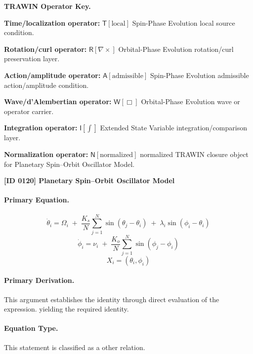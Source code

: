 \par\vspace{0.45\baselineskip}
\noindent\begin{minipage}[t]{\linewidth}
\begingroup
\small
\raggedright
\textbf{TRAWIN Operator Key.}\par
\noindent\textbf{Time/localization operator:} $\mathsf{T}\!\left[\mathrm{local}\right]$ Spin-Phase Evolution local source condition.\par
\noindent\textbf{Rotation/curl operator:} $\mathsf{R}\!\left[\nabla\times\right]$ Orbital-Phase Evolution rotation/curl preservation layer.\par
\noindent\textbf{Action/amplitude operator:} $\mathsf{A}\!\left[\mathrm{admissible}\right]$ Spin-Phase Evolution admissible action/amplitude condition.\par
\noindent\textbf{Wave/d'Alembertian operator:} $\mathsf{W}\!\left[\Box\right]$ Orbital-Phase Evolution wave or operator carrier.\par
\noindent\textbf{Integration operator:} $\mathsf{I}\!\left[\int\right]$ Extended State Variable integration/comparison layer.\par
\noindent\textbf{Normalization operator:} $\mathsf{N}\!\left[\mathrm{normalized}\right]$ normalized TRAWIN closure object for Planetary Spin--Orbit Oscillator Model.\par
\endgroup
\end{minipage}

\clearpage
\noindent\textbf{[ID 0120] Planetary Spin--Orbit Oscillator Model}\par
\vspace{0.35em}
\paragraph{Primary Equation.}
\[
\dot{\theta}_i
=
\Omega_i
\;+\;
\frac{K_s}{N}\sum_{j=1}^{N}\sin(\theta_j-\theta_i)
\;+\;
\lambda_i\sin(\phi_i-\theta_i)
\]
\[
\dot{\phi}_i
=
\nu_i
\;+\;
\frac{K_o}{N}\sum_{j=1}^{N}\sin(\phi_j-\phi_i)
\]
\[
X_i=(\theta_i,\phi_i)
\]

\paragraph{Primary Derivation.}
This argument establishes the identity through direct evaluation of the expression. yielding the required identity.
\paragraph{Equation Type.}
This statement is classified as a other relation.


